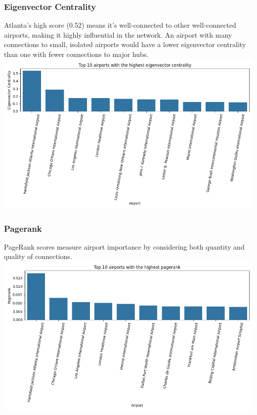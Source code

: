 \documentclass[12pt]{article}
\begin{document}
\begin{minipage}{\textwidth}
    \subsubsection{Eigenvector Centrality}
    {Atlanta's high score (0.52) means it's well-connected to other well-connected airports, making it highly influential in the network. An airport with many connections to small, isolated airports would have a lower eigenvector centrality than one with fewer connections to major hubs.}
    \centering
    \includegraphics[width=1\linewidth]{img/eigenvector_centrality.png}
\end{minipage}

\begin{minipage}{\textwidth}
    \subsubsection{Pagerank}
    {PageRank scores measure airport importance by considering both quantity and quality of connections.}
    \centering
    \includegraphics[width=1\linewidth]{img/pagerank.png}
\end{minipage}
\end{document}
